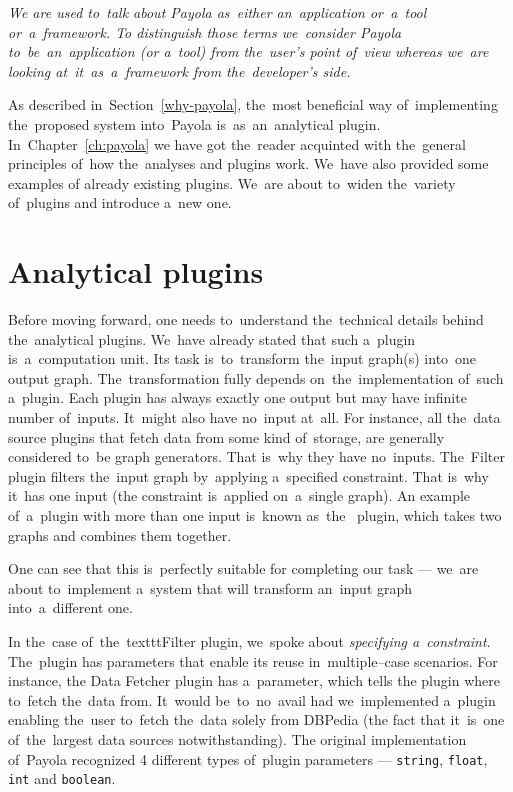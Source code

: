 \emph{We are used to~talk about Payola as~either an~application or~a~tool or~a~framework. To
distinguish those terms we~consider Payola to~be~an~application (or a~tool) from the~user’s
point of~view whereas we~are looking at~it~as~a~framework from the~developer’s side.}

As described in~Section~\ref{why-payola}, the~most beneficial way of~implementing the~proposed system into~Payola is~as~an~analytical plugin. In~Chapter~\ref{ch:payola}
we have got the~reader acquinted with the~general principles of~how the~analyses and plugins work. We~have also provided some examples 
of already existing plugins. We~are about to~widen the~variety of~plugins and 
introduce a~new one.

\section{Analytical plugins}
Before moving forward, one needs to~understand the~technical 
details behind the~analytical plugins. We~have already stated that such a~plugin is~a~computation unit. Its task is~to~transform the~input graph(s) into~one output 
graph. The~transformation fully depends on~the~implementation of~such a~plugin. Each plugin has always exactly one output but may have infinite number of~inputs. It~might also have no~input at~all. For instance, all the~data 
source plugins that fetch data from some kind of~storage, are generally considered to~be
graph generators. That is~why they have no~inputs. The~Filter 
plugin filters the~input graph by~applying a~specified constraint. That is~why it~has one input (the constraint is~applied on~a~single graph).
An example of~a~plugin with more than one input is~known as~the~ 
plugin, which takes two graphs and combines them together.

One can see that this is~perfectly suitable for completing our task --- we~are about to~implement a~system that will transform an~input graph into~a~different one.

In the~case of~the~texttt{Filter} plugin, we~spoke about \emph{specifying a~constraint}. The~plugin has parameters that enable its reuse in~multiple--case scenarios. For instance,
the Data Fetcher plugin has a~parameter, which tells 
the plugin where to~fetch the~data from. It~would be~to~no~avail had we~implemented a~plugin
enabling the~user to~fetch the~data solely from DBPedia (the fact that it~is~one of~the~largest data
sources notwithstanding).
The original implementation of~Payola recognized 4 different types of~plugin 
parameters --- \texttt{string}, \texttt{float}, \texttt{int} and \texttt{boolean}. 

